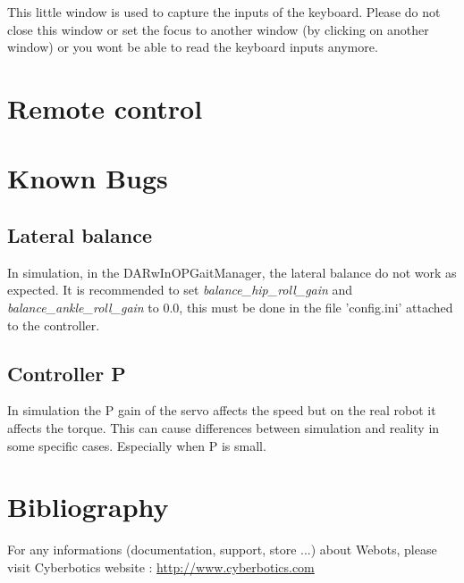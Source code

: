 \documentclass[a4paper, 12pt]{article}  		%
\begin{document}
This little window is used to capture the inputs of the keyboard. Please do not close this window or set the focus to another window (by clicking on another window) or you wont be able to read the keyboard inputs anymore.\\


\newpage
\section{Remote control}


\newpage
\section{Known Bugs}

\subsection{Lateral balance}
In simulation, in the DARwInOPGaitManager, the lateral balance do not work as expected. It is recommended to set \textit{balance\_hip\_roll\_gain} and \textit{balance\_ankle\_roll\_gain} to 0.0, this must be done in the file 'config.ini' attached to the controller.\\

\subsection{Controller P}
In simulation the P gain of the servo affects the speed but on the real robot it affects the torque. This can cause differences between simulation and reality in some specific cases. Especially when P is small.\\


\newpage
\section{Bibliography}

For any informations (documentation, support, store ...) about Webots, please visit Cyberbotics website : \url{http://www.cyberbotics.com}\\
\end{document}
